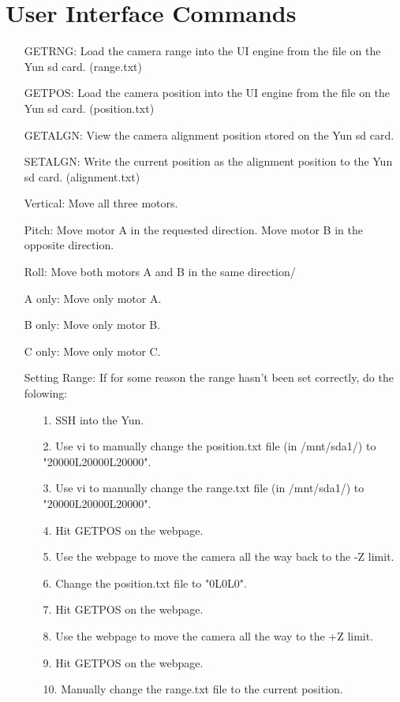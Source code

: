 \documentclass[11pt]{article}
\begin{document}
\section{User Interface Commands}
\begin{enumerate}
	\item[GETRNG:] Load the camera range into the UI engine from the file on the Yun sd card. (range.txt)
	\item[GETPOS:] Load the camera position into the UI engine from the file on the Yun sd card. (position.txt)
	\item[GETALGN:] View the camera alignment position stored on the Yun sd card.
	\item[SETALGN:] Write the current position as the alignment position to the Yun sd card. (alignment.txt)
	\item[Vertical:] Move all three motors.
	\item[Pitch:] Move motor A in the requested direction. Move motor B in the opposite direction.
	\item[Roll:] Move both motors A and B in the same direction/
	\item[A only:] Move only motor A.
	\item[B only:] Move only motor B.
	\item[C only:] Move only motor C.
	
	\item[Setting Range:] If for some reason the range hasn't been set correctly, do the folowing:
	\begin{enumerate} 
		\item[1.]SSH into the Yun.
		\item[2.]Use vi to manually change the position.txt file (in /mnt/sda1/) to "20000L20000L20000".
		\item[3.]Use vi to manually change the range.txt file (in /mnt/sda1/) to "20000L20000L20000".
		\item[4.]Hit GETPOS on the webpage.
		\item[5.]Use the webpage to move the camera all the way back to the -Z limit.
		\item[6.]Change the position.txt file to "0L0L0".
		\item[7.]Hit GETPOS on the webpage.
		\item[8.]Use the webpage to move the camera all the way to the +Z limit.
		\item[9.]Hit GETPOS on the webpage.
		\item[10.]Manually change the range.txt file to the current position.
	\end{enumerate}
\end{enumerate}
\end{document}

